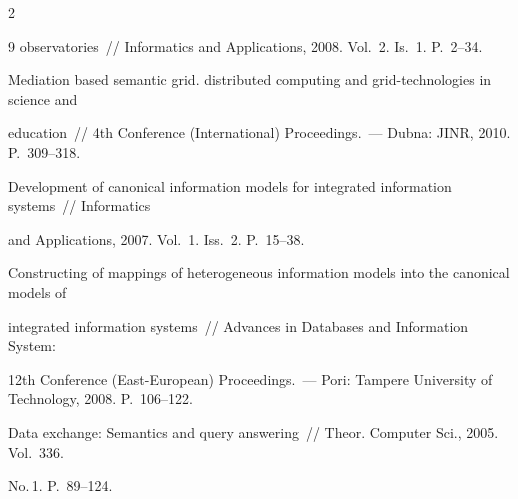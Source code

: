 \begin{multicols}{2}
{{\begin{thebibliography}{9}
observatories~// Informatics and Applications, 2008.  Vol.~2. Is.~1. P.~2--34.









Mediation based semantic grid. distributed computing and grid-technologies in science and 


education~// 4th  Conference (International) Proceedings.~--- Dubna: JINR, 2010.  P.~309--318.









Development of canonical information models for integrated information systems~// Informatics 


and Applications, 2007.  Vol.~1. Iss.~2. P.~15--38.









Constructing of mappings of heterogeneous information models into the canonical models of 


integrated information systems~// Advances in Databases and Information System:  


12th  Conference (East-European) Proceedings.~--- Pori: Tampere University of Technology, 2008.  P.~106--122.









Data exchange: Semantics and query answering~// Theor. Computer Sci., 2005.  Vol.~336. 


No.\,1. P.~89--124.





 \end{thebibliography}


}


}








\end{multicols}





